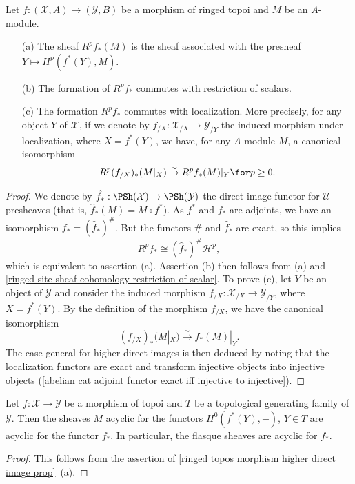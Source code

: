 \begin{proposition}\label{ringed topos morphism higher direct image prop}
Let $f:(\mathcal{X},A)\to (\mathcal{Y},B)$ be a morphism of ringed topoi and $M$ be an $A$-module.
\begin{enumerate}
\item[(a)] The sheaf $R^pf_*(M)$ is the sheaf associated with the presheaf $Y\mapsto H^p(f^*(Y),M)$.
\item[(b)] The formation of $R^pf_*$ commutes with restriction of scalars.
\item[(c)] The formation $R^pf_*$ commutes with localization. More precisely, for any object $Y$ of $\mathcal{X}$, if we denote by $f_{/X}:\mathcal{X}_{/X}\to \mathcal{Y}_{/Y}$ the induced morphism under localization, where $X=f^*(Y)$, we have, for any $A$-module $M$, a canonical isomorphism
\begin{equation}\label{ringed topos morphism higher direct image prop-1}
R^p(f_{/X})_*(M|_X) \stackrel{\sim}{\to } R^pf_*(M)|_Y\for p\geq 0.
\end{equation}
\end{enumerate}
\end{proposition}
\begin{proof}
We denote by $\hat{f}_*:\PSh(\mathcal{X})\to \PSh(\mathcal{Y})$ the direct image functor for $\mathscr{U}$-presheaves (that is, $\hat{f}_*(M)=M\circ f^*$). As $f^*$ and $f_*$ are adjoints, we have an isomorphism $f_*=(\hat{f}_*)^\#$. But the functors $\#$ and $\hat{f}_*$ are exact, so this implies
\[R^pf_*\cong(\hat{f}_*)^\#\mathcal{H}^p,\]
which is equivalent to assertion (a). Assertion (b) then follows from (a) and \cref{ringed site sheaf cohomology restriction of scalar}. To prove (c), let $Y$ be an object of $\mathcal{Y}$ and consider the induced morphism $f_{/X}:\mathcal{X}_{/X}\to \mathcal{Y}_{/Y}$, where $X=f^*(Y)$. By the definition of the morphism $f_{/X}$, we have the canonical isomorphism
\[(f_{/X})_*(M|_{X}) \stackrel{\sim}{\to } f_*(M)|_Y.\]
The case general for higher direct images is then deduced by noting that the localization functors are exact and transform injective objects into injective objects (\cref{abelian cat adjoint functor exact iff injective to injective}).
\end{proof}

\begin{proposition}\label{ringed topos morphism acyclic direct image prop}
Let $f:\mathcal{X}\to \mathcal{Y}$ be a morphism of topoi and $T$ be a topological generating family of $\mathcal{Y}$. Then the sheaves $M$ acyclic for the functors $H^0(f^*(Y),-)$, $Y\in T$ are acyclic for the functor $f_*$. In particular, the flasque sheaves are acyclic for $f_*$.
\end{proposition}
\begin{proof}
This follows from the assertion of \cref{ringed topos morphism higher direct image prop}~(a).
\end{proof}

